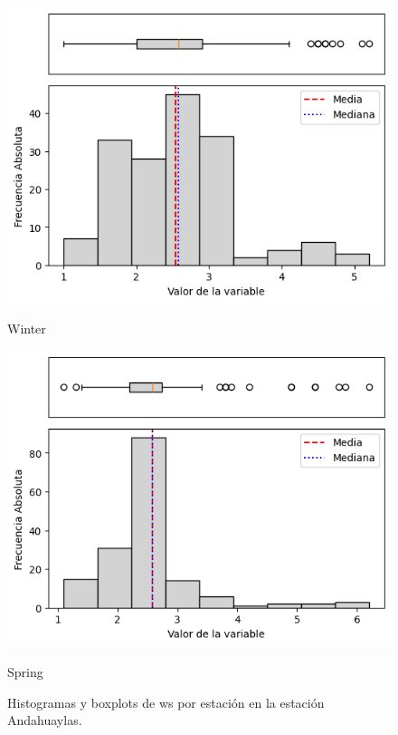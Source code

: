 \begin{figure}[htbp]
\vspace{0.2cm}

\begin{minipage}{0.30\textwidth}
  \includegraphics[width=\linewidth]{resultados/por_estacion_del_anio/boxplot_clases_por_estacion/Andahuaylas/WS_HistBoxplot_Winter.png}
  \caption*{Winter}
\end{minipage}
\hfill
\begin{minipage}{0.30\textwidth}
  \includegraphics[width=\linewidth]{resultados/por_estacion_del_anio/boxplot_clases_por_estacion/Andahuaylas/WS_HistBoxplot_Spring.png}
  \caption*{Spring}
\end{minipage}
\caption{Histogramas y boxplots de \gls{ws}  por estación en la estación Andahuaylas.}
\label{fig:andahuaylas_ws_hist}
\end{figure}

